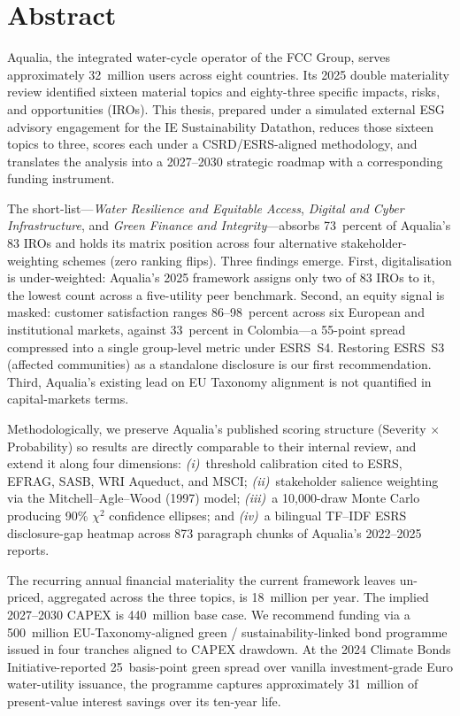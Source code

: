 \documentclass[11pt, a4paper, twoside, openright]{scrreprt}
\newcommand{\euro}{\texteuro}
\begin{document}

\chapter*{Abstract}

\noindent
Aqualia, the integrated water-cycle operator of the FCC Group, serves approximately 32~million users across eight countries. Its 2025 double materiality review identified sixteen material topics and eighty-three specific impacts, risks, and opportunities (IROs). This thesis, prepared under a simulated external ESG advisory engagement for the IE Sustainability Datathon, reduces those sixteen topics to three, scores each under a CSRD/ESRS-aligned methodology, and translates the analysis into a 2027--2030 strategic roadmap with a corresponding funding instrument.

\medskip
The short-list---\emph{Water Resilience and Equitable Access}, \emph{Digital and Cyber Infrastructure}, and \emph{Green Finance and Integrity}---absorbs 73~percent of Aqualia's 83 IROs and holds its matrix position across four alternative stakeholder-weighting schemes (zero ranking flips). Three findings emerge. First, digitalisation is under-weighted: Aqualia's 2025 framework assigns only two of 83 IROs to it, the lowest count across a five-utility peer benchmark. Second, an equity signal is masked: customer satisfaction ranges 86--98~percent across six European and institutional markets, against 33~percent in Colombia---a 55-point spread compressed into a single group-level metric under ESRS~S4. Restoring ESRS~S3 (affected communities) as a standalone disclosure is our first recommendation. Third, Aqualia's existing lead on EU Taxonomy alignment is not quantified in capital-markets terms.

\medskip
Methodologically, we preserve Aqualia's published scoring structure (Severity $\times$ Probability) so results are directly comparable to their internal review, and extend it along four dimensions: \emph{(i)}~threshold calibration cited to ESRS, EFRAG, SASB, WRI Aqueduct, and MSCI; \emph{(ii)}~stakeholder salience weighting via the Mitchell--Agle--Wood (1997) model; \emph{(iii)}~a 10{,}000-draw Monte Carlo producing 90\% $\chi^2$ confidence ellipses; and \emph{(iv)}~a bilingual TF--IDF ESRS disclosure-gap heatmap across 873 paragraph chunks of Aqualia's 2022--2025 reports.

\medskip
The recurring annual financial materiality the current framework leaves un-priced, aggregated across the three topics, is \euro{}18~million per year. The implied 2027--2030 CAPEX is \euro{}440~million base case. We recommend funding via a \euro{}500~million EU-Taxonomy-aligned green / sustainability-linked bond programme issued in four tranches aligned to CAPEX drawdown. At the 2024 Climate Bonds Initiative-reported 25~basis-point green spread over vanilla investment-grade Euro water-utility issuance, the programme captures approximately \euro{}31~million of present-value interest savings over its ten-year life.
\end{document}
